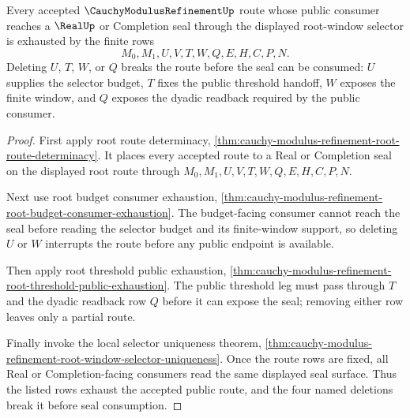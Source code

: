 \begin{theorem}
\label{thm:cauchy-modulus-refinement-window-selector-threshold-exhaustion}
Every accepted $\CauchyModulusRefinementUp$ route whose public consumer reaches a $\RealUp$ or Completion seal through the displayed root-window selector is exhausted by the finite rows
$$
M_0,M_1,U,V,T,W,Q,E,H,C,P,N.
$$
Deleting $U$, $T$, $W$, or $Q$ breaks the route before the seal can be consumed: $U$ supplies the selector budget, $T$ fixes the public threshold handoff, $W$ exposes the finite window, and $Q$ exposes the dyadic readback required by the public consumer.
\end{theorem}
\begin{proof}
First apply root route determinacy, \autoref{thm:cauchy-modulus-refinement-root-route-determinacy}. It places every accepted route to a Real or Completion seal on the displayed root route through $M_0,M_1,U,V,T,W,Q,E,H,C,P,N$.

Next use root budget consumer exhaustion, \autoref{thm:cauchy-modulus-refinement-root-budget-consumer-exhaustion}. The budget-facing consumer cannot reach the seal before reading the selector budget and its finite-window support, so deleting $U$ or $W$ interrupts the route before any public endpoint is available.

Then apply root threshold public exhaustion, \autoref{thm:cauchy-modulus-refinement-root-threshold-public-exhaustion}. The public threshold leg must pass through $T$ and the dyadic readback row $Q$ before it can expose the seal; removing either row leaves only a partial route.

Finally invoke the local selector uniqueness theorem, \autoref{thm:cauchy-modulus-refinement-root-window-selector-uniqueness}. Once the route rows are fixed, all Real or Completion-facing consumers read the same displayed seal surface. Thus the listed rows exhaust the accepted public route, and the four named deletions break it before seal consumption.
\end{proof}

